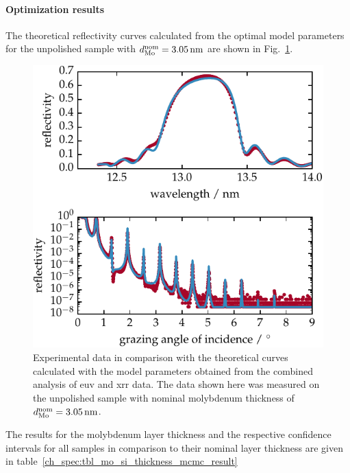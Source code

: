 \paragraph{Optimization results}
The theoretical reflectivity curves calculated from the optimal model parameters for the unpolished sample with $d_\text{Mo}^\text{nom} = \nm{3.05}$ are shown in Fig.~\ref{ch_spec:fig_EUV_XRR_combined}.
\begin{figure}[htbp]
\centering
\includegraphics{img/PS5657}
\caption{Experimental data in comparison with the theoretical curves calculated with the model parameters obtained from the combined analysis of \gls{euv} and \gls{xrr} data. The data shown here was measured on the unpolished sample with nominal molybdenum thickness of $d_\text{Mo}^\text{nom} = \nm{3.05}$.}
\label{ch_spec:fig_EUV_XRR_combined}
\end{figure}
The results for the molybdenum layer thickness and the respective confidence intervals for all samples in comparison to their nominal layer thickness are given in table~\ref{ch_spec:tbl_mo_si_thickness_mcmc_result}
